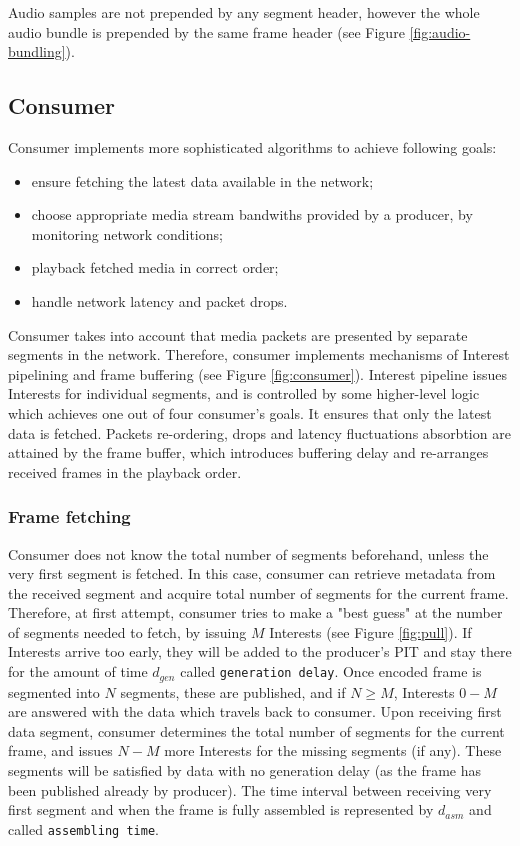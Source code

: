\documentclass{icn/sig-alternate-2012} %
\begin{document}
Audio samples are not prepended by any segment header, however the whole audio bundle is prepended by the same frame header (see Figure \ref{fig:audio-bundling}).

\subsection{Consumer}

Consumer implements more sophisticated algorithms to achieve following goals:
\begin{itemize}
\item ensure fetching the latest data available in the network; 
\item choose appropriate media stream bandwiths provided by a producer, by monitoring network conditions;
\item playback fetched media in correct order;
\item handle network latency and packet drops.
\end{itemize}

Consumer takes into account that media packets are presented by separate segments in the network. Therefore, consumer implements mechanisms of Interest pipelining and frame buffering (see Figure \ref{fig:consumer}). Interest pipeline issues Interests for individual segments, and is controlled by some higher-level logic which achieves one out of four consumer's goals. It ensures that only the latest data is fetched. Packets re-ordering, drops and latency fluctuations absorbtion are attained by the frame buffer, which introduces buffering delay and re-arranges received frames in the playback order.



\subsubsection{Frame fetching}

Consumer does not know the total number of segments beforehand, unless the very first segment is fetched. In this case, consumer can retrieve metadata from the received segment and acquire total number of segments for the current frame. 
Therefore, at first attempt, consumer tries to make a "best guess" at the number of segments needed to fetch, by issuing $M$ Interests (see Figure \ref{fig:pull}). If Interests arrive too early, they will be added to the producer's PIT and stay there for the amount of time $d_{gen}$ called \texttt{generation delay}. Once encoded frame is segmented into $N$ segments, these are published, and if $N\geq M$, Interests $0 - M$ are answered with the data which travels back to consumer. Upon receiving first data segment, consumer determines the total number of segments for the current frame, and issues $N - M$ more Interests for the missing segments (if any). These segments will be satisfied by data with no generation delay (as the frame has been published already by producer). The time interval between receiving very first segment and when the frame is fully assembled is represented by $d_{asm}$ and called \texttt{assembling time}.
\end{document}
